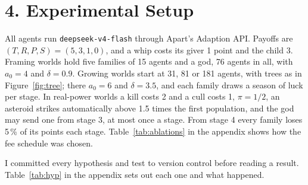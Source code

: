 \section*{4. Experimental Setup}
All agents run \texttt{deepseek-v4-flash} through Apart's Adaption API. Payoffs are $(T, R, P, S) = (5, 3, 1, 0)$, and a whip costs its giver 1 point and the child 3. Framing worlds hold five families of 15 agents and a god, 76 agents in all, with $a_0 = 4$ and $\delta = 0.9$. Growing worlds start at 31, 81 or 181 agents, with trees as in Figure~\ref{fig:tree}; there $a_0 = 6$ and $\delta = 3.5$, and each family draws a season of luck per stage. In real-power worlds a kill costs 2 and a cull costs 1, $\pi = 1/2$, an asteroid strikes automatically above 1.5 times the first population, and the god may send one from stage 3, at most once a stage. From stage 4 every family loses 5\,\% of its points each stage. Table~\ref{tab:ablations} in the appendix shows how the fee schedule was chosen.

I committed every hypothesis and test to version control before reading a result. Table~\ref{tab:hyp} in the appendix sets out each one and what happened.
